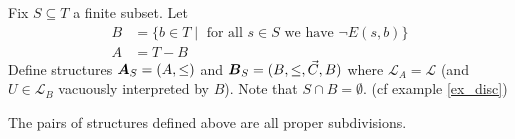 \documentclass{amsart}
\DeclareMathOperator{\A}{\boldface A}
\DeclareMathOperator{\B}{\boldface B}
\renewcommand{\LL}{\mathcal L}
\begin{document}
\begin{Definition}
	Fix $S \subseteq T$ a finite subset. Let
	\begin{align*}
		B &= \{b \in T \mid \text{ for all $s \in S$ we have } \neg E(s, b)\} \\
		A &= T - B
	\end{align*}
	Define structures $\A_{S} = (A, \leq)$ and $\B_{S} = (B, \leq, \vec C, B)$ where $\LL_A = \LL$ (and $U \in \LL_B$ vacuously interpreted by $B$). Note that $S \cap B = \emptyset$. (cf example \ref{ex_disc})
\end{Definition}

\begin{Lemma} \label{subdivide}
	The pairs of structures defined above are all proper subdivisions.
\end{Lemma}
\end{document}
